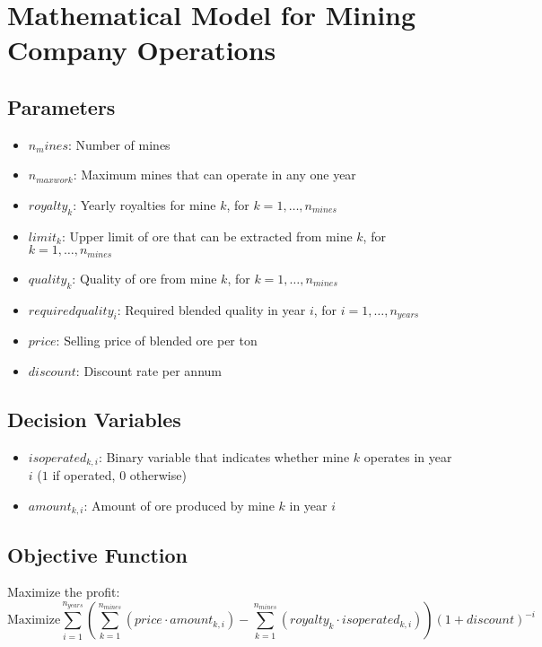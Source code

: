 \documentclass{article}
\begin{document}
\section*{Mathematical Model for Mining Company Operations}

\subsection*{Parameters}
\begin{itemize}
    \item $n_mines$: Number of mines
    \item $n_{maxwork}$: Maximum mines that can operate in any one year
    \item $royalty_k$: Yearly royalties for mine $k$, for $k = 1, \ldots, n_{mines}$
    \item $limit_k$: Upper limit of ore that can be extracted from mine $k$, for $k = 1, \ldots, n_{mines}$
    \item $quality_k$: Quality of ore from mine $k$, for $k = 1, \ldots, n_{mines}$
    \item $requiredquality_i$: Required blended quality in year $i$, for $i = 1, \ldots, n_{years}$
    \item $price$: Selling price of blended ore per ton
    \item $discount$: Discount rate per annum
\end{itemize}

\subsection*{Decision Variables}
\begin{itemize}
    \item $isoperated_{k, i}$: Binary variable that indicates whether mine $k$ operates in year $i$ ($1$ if operated, $0$ otherwise)
    \item $amount_{k, i}$: Amount of ore produced by mine $k$ in year $i$
\end{itemize}

\subsection*{Objective Function}
Maximize the profit:
\[
\text{Maximize} \sum_{i=1}^{n_{years}} \left( \sum_{k=1}^{n_{mines}} (price \cdot amount_{k, i}) - \sum_{k=1}^{n_{mines}} (royalty_k \cdot isoperated_{k,i}) \right) (1 + discount)^{-i}
\]
\end{document}
